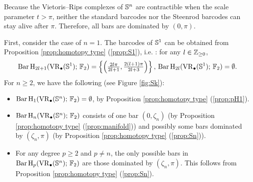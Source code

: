 \begin{example}
\label{ex:Sn}
Because the Vietoris--Rips complexes of $\mathbb{S}^n$ are contractible when the scale parameter $t>\pi$, neither the standard barcodes nor the Steenrod barcodes can stay alive after $\pi$. Therefore, all bars are dominated by $(0,\pi)$. 

First, consider the case of $n=1$.
The barcodes of $\mathbb{S}^1$ can be obtained from Proposition \ref{prop:homotopy type} (\ref{prop:S1}), i.e. \cite[Theorem 7.4]{adamaszek2017vietoris}: for any $l\in \mathbb{Z}_{\geq 0}$,
\begin{equation}\label{eq:barc of S1}
    \operatorname{Bar} \operatorname{H}_{2l+1}(\operatorname{VR}_\bullet(\mathbb{S}^1);\,{\mathbb{F}_2})=\left\{\left(\tfrac{2l\pi}{2l+1},\tfrac{2(l+1)\pi}{2l+3}\right)\right\},\, \operatorname{Bar} \operatorname{H}_{2l}(\operatorname{VR}_\bullet(\mathbb{S}^1);\,{\mathbb{F}_2})=\emptyset.
\end{equation}
For $n\geq 2$, we have the following (see Figure \ref{fig:Sk}):
\begin{itemize}
    \item $\operatorname{Bar} \operatorname{H}_{1}(\operatorname{VR}_\bullet(\mathbb{S}^n);\,{\mathbb{F}_2})=\emptyset$, by Proposition \ref{prop:homotopy type} (\ref{prop:pH1}).
    \item $\operatorname{Bar} \operatorname{H}_{n}(\operatorname{VR}_\bullet(\mathbb{S}^n);\,{\mathbb{F}_2})$ consists of one bar $(0,\zeta_n)$ (by Proposition \ref{prop:homotopy type} (\ref{prop:manifold})) and possibly some bars dominated by $(\zeta_n,\pi)$ (by Proposition \ref{prop:homotopy type} (\ref{prop:Sn})). 
    \item For any degree $p\geq 2$ and $p\neq n$, the only possible bars in $\operatorname{Bar} \operatorname{H}_{p}(\operatorname{VR}_\bullet(\mathbb{S}^n);\,{\mathbb{F}_2})$ are those  dominated by  $(\zeta_n,\pi)$. This follows from  Proposition \ref{prop:homotopy type} (\ref{prop:Sn}). 
\end{itemize}


\end{example}
